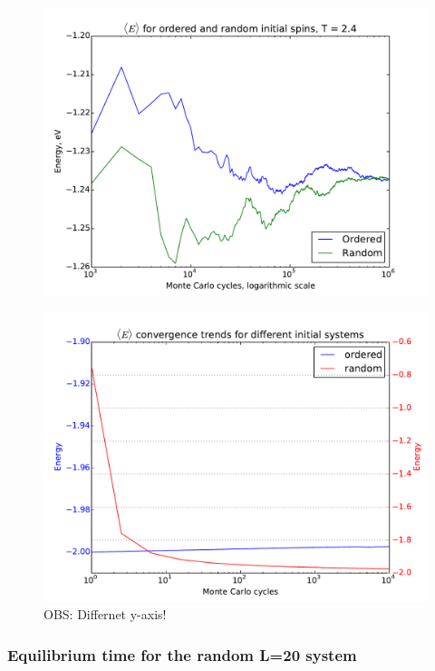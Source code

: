 \begin{figure}[H]
		\centering
	\includegraphics[width=0.7\linewidth]{../results/4c/ran_order_T2}
	\caption{}
	\label{fig:ranordert2}
\end{figure}



\begin{figure}[H]
	\centering
	\includegraphics[width=0.7\linewidth]{../results/4c/ran_order_T1_start}
	\caption{OBS: Differnet y-axis! }
	\label{fig:ranorder_t1_start}
\end{figure}




\subsubsection{Equilibrium time  for the random L=20 system}





